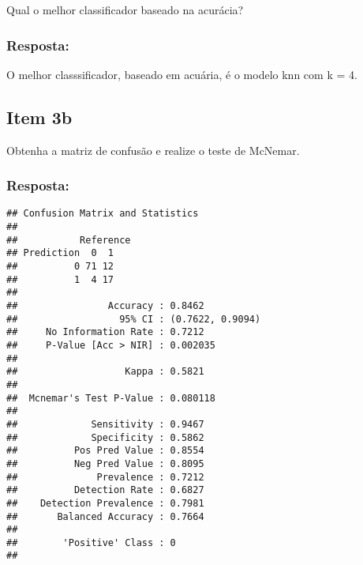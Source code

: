 \documentclass[
]{article}
\newenvironment{Shaded}{\begin{snugshade}}{\end{snugshade}}
\newcommand{\FunctionTok}[1]{\textcolor[rgb]{0.00,0.00,0.00}{#1}}
\newcommand{\NormalTok}[1]{#1}
\newcommand{\OtherTok}[1]{\textcolor[rgb]{0.56,0.35,0.01}{#1}}
\newcommand{\SpecialCharTok}[1]{\textcolor[rgb]{0.00,0.00,0.00}{#1}}
\newcommand{\StringTok}[1]{\textcolor[rgb]{0.31,0.60,0.02}{#1}}
\begin{document}
Qual o melhor classificador baseado na acurácia?

\hypertarget{resposta-3}{%
\subsubsection{Resposta:}\label{resposta-3}}

O melhor classsificador, baseado em acuária, é o modelo knn com k = 4.

\hypertarget{item-3b}{%
\subsection{Item 3b}\label{item-3b}}

Obtenha a matriz de confusão e realize o teste de McNemar.

\hypertarget{resposta-4}{%
\subsubsection{Resposta:}\label{resposta-4}}

\begin{Shaded}
\end{Shaded}

\begin{verbatim}
## Confusion Matrix and Statistics
## 
##           Reference
## Prediction  0  1
##          0 71 12
##          1  4 17
##                                           
##                Accuracy : 0.8462          
##                  95% CI : (0.7622, 0.9094)
##     No Information Rate : 0.7212          
##     P-Value [Acc > NIR] : 0.002035        
##                                           
##                   Kappa : 0.5821          
##                                           
##  Mcnemar's Test P-Value : 0.080118        
##                                           
##             Sensitivity : 0.9467          
##             Specificity : 0.5862          
##          Pos Pred Value : 0.8554          
##          Neg Pred Value : 0.8095          
##              Prevalence : 0.7212          
##          Detection Rate : 0.6827          
##    Detection Prevalence : 0.7981          
##       Balanced Accuracy : 0.7664          
##                                           
##        'Positive' Class : 0               
## 
\end{verbatim}
\end{document}
